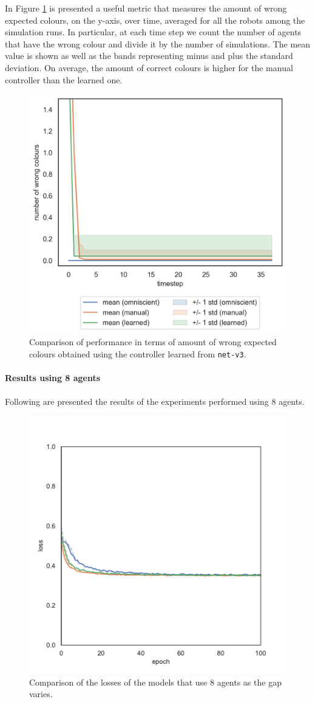 In Figure \ref{fig:net-v3error} is presented a useful metric that measures the 
amount of wrong expected colours, on the y-axis, over time, averaged for all the 
robots among the simulation runs. In particular, at each time step we count the 
number of agents that have the wrong colour and divide it by the number of 
simulations.
The mean value is shown as well as the bands representing minus and plus the 
standard deviation.
On average, the amount of correct colours is higher for the manual controller 
than the learned one. 
\begin{figure}[!htb]
	\centering
	\includegraphics[width=.5\textwidth]{contents/images/net-v3/colours-errors-compressed}%
	\caption[Evaluation of \texttt{net-v3} amount of wrong expected 
	colours.]{Comparison of performance in terms of amount of wrong expected 
		colours obtained using the controller learned from \texttt{net-v3}.}
	\label{fig:net-v3error}
	\vspace{-0.5cm}
\end{figure}

\paragraph*{Results using 8 agents}
Following are presented the results of the experiments performed using $8$ 
agents. 
\begin{figure}[H]
	\centering
	\includegraphics[width=.5\textwidth]{contents/images/task2/loss-communication-N8}
	\caption{Comparison of the losses of the models that use $8$ agents as the gap 
		varies.}
	\label{fig:commlossn8t2}
\end{figure}

